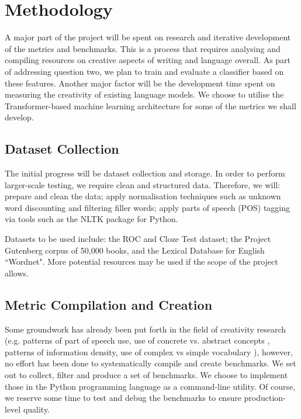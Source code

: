 \documentclass[a4paper,12pt]{article}
\begin{document}


\section*{Methodology}
A major part of the project will be spent on research and iterative development of the metrics and benchmarks. This is a process that requires analysing and compiling resources on creative aspects of writing and language overall. As part of addressing question two, we plan to train and evaluate a classifier based on these features. 
Another major factor will be the development time spent on measuring the creativity of existing language models. We choose to utilise the Transformer-based machine learning architecture\cite{vaswani_attention_2017} for some of the metrics we shall develop. 

\subsection*{Dataset Collection}
The initial progress will be dataset collection and storage. In order to perform larger-scale testing, we require clean and structured data. Therefore, we will: prepare and clean the data; apply normalisation techniques such as unknown word discounting and filtering filler words; apply parts of speech (POS) tagging via tools such as the NLTK package for Python\cite{nltk_citation}. 

Datasets to be used include: the ROC and Cloze Test dataset\cite{mostafazadeh-etal-2016-corpus}; the Project Gutenberg corpus of 50,000 books\cite{gutenberg_dataset}, and the Lexical Database for English ``Wordnet"\cite{wordnet_princeton}. More potential resources may be used if the scope of the project allows.

\subsection*{Metric Compilation and Creation}
Some groundwork has already been put forth in the field of creativity research (e.g. patterns of part of speech use, use of concrete vs. abstract concepts \cite{brysbaert2014concreteness}, patterns of information density\cite{giulianelli2021analysing}, use of complex vs simple vocabulary \cite{kuperman2012age}), however, no effort has been done to systematically compile and create benchmarks. 
We set out to collect, filter and produce a set of benchmarks. We choose to implement those in the Python programming language as a command-line utility. Of course, we reserve some time to test and debug the benchmarks to ensure production-level quality.
\end{document}
